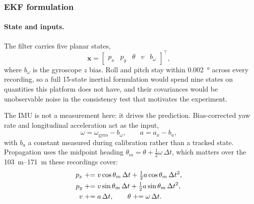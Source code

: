 \subsubsection{EKF formulation}
\label{sec:ekf-formulation}

\paragraph{State and inputs.} The filter carries five planar states,
\begin{equation}
  \mathbf{x} = \begin{bmatrix}p_x & p_y & \theta & v & b_\omega\end{bmatrix}^{\top},
  \label{eq:ekf-state}
\end{equation}
where $b_\omega$ is the gyroscope $z$ bias. Roll and pitch stay within
\SI{0.002}{\degree} across every recording, so a full 15-state inertial
formulation would spend nine states on quantities this platform does not have,
and their covariances would be unobservable noise in the consistency test that
motivates the experiment.

The IMU is not a measurement here: it drives the prediction. Bias-corrected yaw
rate and longitudinal acceleration act as the input,
\begin{equation}
  \omega = \omega_{\text{gyro}} - b_\omega, \qquad a = a_x - b_a,
  \label{eq:ekf-input}
\end{equation}
with $b_a$ a constant measured during calibration rather than a tracked state.
Propagation uses the midpoint heading $\theta_m = \theta + \tfrac{1}{2}\omega\,\Delta t$,
which matters over the \SIrange{103}{171}{\metre} these recordings cover:
\begin{align}
  p_x &\mathrel{+}= v\cos\theta_m\,\Delta t + \tfrac{1}{2}a\cos\theta_m\,\Delta t^2, \notag\\
  p_y &\mathrel{+}= v\sin\theta_m\,\Delta t + \tfrac{1}{2}a\sin\theta_m\,\Delta t^2, \notag\\
  v   &\mathrel{+}= a\,\Delta t, \qquad \theta \mathrel{+}= \omega\,\Delta t.
  \label{eq:ekf-propagate}
\end{align}

